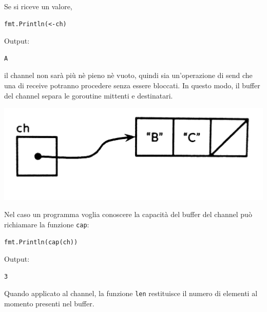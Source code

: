 \documentclass[../../../thesis.tex]{subfiles}
\begin{document}
    Se si riceve un valore,
    \begin{lstlisting}[frame = single, label = {lst:lstlisting7-4-4.3}]
fmt.Println(<-ch)
    \end{lstlisting}
    Output:
    \begin{lstlisting}[language = bash, frame = L, label = {lst:lstlisting7-4-4.4}]
A
    \end{lstlisting}
    il channel non sarà più nè pieno nè vuoto, quindi sia un'operazione di send che una di receive potranno procedere senza essere bloccati.
    In questo modo, il buffer del channel separa le goroutine mittenti e destinatari.
    \begin{center}
        \includegraphics[scale = 0.125]{figure-8.4}
    \end{center}
    Nel caso un programma voglia conoscere la capacità del buffer del channel può richiamare la funzione \verb"cap":
    \begin{lstlisting}[frame = single, label = {lst:lstlisting7-4-4.5}]
fmt.Println(cap(ch))
    \end{lstlisting}
    Output:
    \begin{lstlisting}[language = bash, frame = L, label = {lst:lstlisting7-4-4.6}]
3
    \end{lstlisting}
    Quando applicato al channel, la funzione \verb"len" restituisce il numero di elementi al momento presenti nel buffer.
    \hfill \vspace{12pt}
\end{document}
